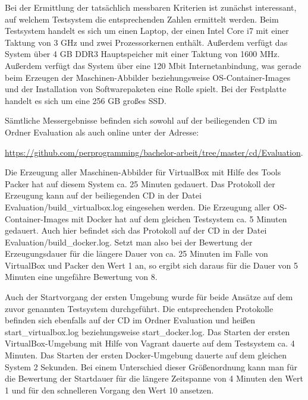 Bei der Ermittlung der tatsächlich messbaren Kriterien ist zunächst interessant, auf welchem Testsystem die entsprechenden Zahlen ermittelt werden. Beim Testsystem handelt es sich um einen Laptop, der einen Intel Core i7 mit einer Taktung von 3 GHz und zwei Prozessorkernen enthält. Außerdem verfügt das System über 4 GB DDR3 Hauptspeicher mit einer Taktung von 1600 MHz. Außerdem verfügt das System über eine 120 Mbit Internetanbindung, was gerade beim Erzeugen der Maschinen-Abbilder beziehungsweise OS-Container-Images und der Installation von Softwarepaketen eine Rolle spielt. Bei der Festplatte handelt es sich um eine 256 GB großes \ac{SSD}.

Sämtliche Messergebnisse befinden sich sowohl auf der beiliegenden CD im Ordner Evaluation als auch online unter der Adresse:

\href{https://github.com/perprogramming/bachelor-arbeit/tree/master/cd/Evaluation}{https://github.com/perprogramming/bachelor-arbeit/tree/master/cd/Evaluation}.

Die Erzeugung aller Maschinen-Abbilder für VirtualBox mit Hilfe des Tools Packer hat auf diesem System ca. 25 Minuten gedauert. Das Protokoll der Erzeugung kann auf der beiliegenden CD in der Datei Evaluation/build\_virtualbox.log eingesehen werden. Die Erzeugung aller OS-Container-Images mit Docker hat auf dem gleichen Testsystem ca. 5 Minuten gedauert. Auch hier befindet sich das Protokoll auf der CD in der Datei Evaluation/build\_docker.log. Setzt man also bei der Bewertung der Erzeugungsdauer für die längere Dauer von ca. 25 Minuten im Falle von VirtualBox und Packer den Wert 1 an, so ergibt sich daraus für die Dauer von 5 Minuten eine ungefähre Bewertung von 8.

Auch der Startvorgang der ersten Umgebung wurde für beide Ansätze auf dem zuvor genannten Testsystem durchgeführt. Die entsprechenden Protokolle befinden sich ebenfalls auf der CD im Ordner Evaluation und heißen start\_virtualbox.log beziehungsweise start\_docker.log. Das Starten der ersten VirtualBox-Umgebung mit Hilfe von Vagrant dauerte auf dem Testsystem ca. 4 Minuten. Das Starten der ersten Docker-Umgebung dauerte auf dem gleichen System 2 Sekunden. Bei einem Unterschied dieser Größenordnung kann man für die Bewertung der Startdauer für die längere Zeitspanne von 4 Minuten den Wert 1 und für den schnelleren Vorgang den Wert 10 ansetzen.

